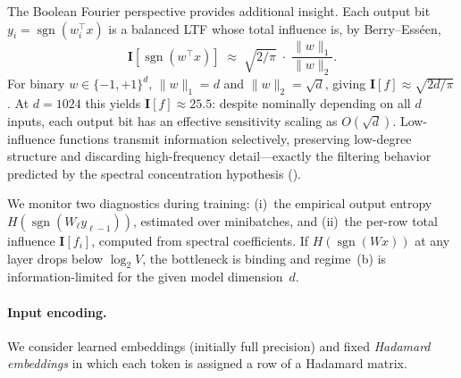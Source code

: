 \documentclass[12pt,a4paper]{article}
\theoremstyle{plain}
\theoremstyle{definition}
\theoremstyle{remark}
\newcommand{\pmone}{\{-1,+1\}}
\newcommand{\sgn}{\operatorname{sgn}}
\begin{document}
The Boolean Fourier perspective provides additional insight.
Each output bit $y_i = \sgn(w_i^\top x)$ is a balanced LTF whose total influence is, by Berry--Ess\'een,
\begin{equation}\label{eq:ltf-influence}
  \mathbf{I}[\sgn(w^\top x)] \;\approx\; \sqrt{2/\pi}\;\cdot\; \frac{\|w\|_1}{\|w\|_2}.
\end{equation}
For binary $w \in \pmone^d$, $\|w\|_1 = d$ and $\|w\|_2 = \sqrt{d}$, giving $\mathbf{I}[f] \approx \sqrt{2d/\pi}$.
At $d = 1024$ this yields $\mathbf{I}[f] \approx 25.5$: despite nominally depending on all $d$ inputs, each output bit has an effective sensitivity scaling as $O(\sqrt{d})$.
Low-influence functions transmit information selectively, preserving low-degree structure and discarding high-frequency detail---exactly the filtering behavior predicted by the spectral concentration hypothesis ().

We monitor two diagnostics during training: (i)~the empirical output entropy $H(\sgn(W_\ell y_{\ell-1}))$, estimated over minibatches, and (ii)~the per-row total influence $\mathbf{I}[f_i]$, computed from spectral coefficients.
If $H(\sgn(Wx))$ at any layer drops below $\log_2 V$, the bottleneck is binding and regime~(b) is information-limited for the given model dimension~$d$.

\paragraph{Input encoding.}
We consider learned embeddings (initially full precision) and fixed \emph{Hadamard embeddings} in which each token is assigned a row of a Hadamard matrix.
\end{document}
